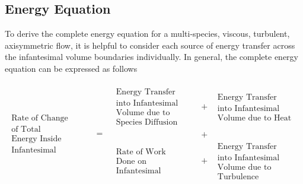 \subsection{Energy Equation}

	To derive the complete energy equation for a multi-species, viscous, turbulent, axisymmetric flow, it is helpful to 
consider each source of energy transfer across the infantesimal volume boundaries individually.  In general, the 
complete energy equation can be expressed as follows

\begin{displaymath}
	\begin{array}{ccc}
		\begin{array}{c}
		\textrm{Rate of Change} \\ \textrm{of Total} \\ \textrm{Energy Inside} \\ \textrm{Infantesimal Volume}
		\end{array} & = &
	   \begin{array}{ccc}
		\begin{array}{c}
		\textrm{Energy Transfer} \\ \textrm{into Infantesimal}\\ \textrm{Volume due to}\\ \textrm{Species Diffusion}
		\end{array} & + &
		\begin{array}{c}
		\textrm{Energy Transfer} \\ \textrm{into Infantesimal}\\ \textrm{Volume due to Heat}
		\end{array}  
		\\ & + & \\
		\begin{array}{c}
		\textrm{Rate of Work}\\ \textrm{Done on} \\ \textrm{Infantesimal Volume}
		\end{array} & + &
		\begin{array}{c}
		\textrm{Energy Transfer} \\ \textrm{into Infantesimal}\\ \textrm{Volume due to}\\ 
		\textrm{Turbulence Diffusion}  
		\end{array}
	   \end{array}
	\end{array}
\end{displaymath}

